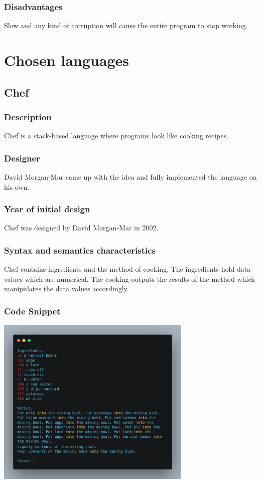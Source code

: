 \documentclass[12pt]{article}
\begin{document}
\subsubsection{Disadvantages}
Slow and any kind of corruption will cause the entire program to stop working.
\cite{Question2Encoding}

\section{Chosen languages \hfill {}}
\subsection{Chef}
\subsubsection{Description}
Chef is a stack-based language where programs look like cooking recipes.
\subsubsection*{Designer}
David Morgan-Mar came up with the idea and fully implemented the language on his own.
\subsubsection*{Year of initial design}
Chef was designed by David Morgan-Mar in 2002.
\subsubsection*{Syntax and semantics characteristics}
Chef contains ingredients and the method of cooking.
The ingredients hold data values which are numerical.
The cooking outputs the results of the method which manipulates the data values accordingly.
\cite{Question3Chef}
\subsubsection{Code Snippet}
\begin{center}\includegraphics[width=0.7\textwidth]{assets/chef.png}
    \cite{Question3Pics}
\end{center}
\end{document}
